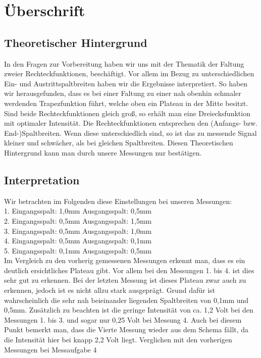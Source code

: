 
\section{Überschrift}
\subsection {Theoretischer Hintergrund}
In den Fragen zur Vorbereitung haben wir uns mit der Thematik der Faltung zweier Rechteckfunktionen, besch\"aftigt. Vor allem im Bezug zu unterschiedlichen Ein- und Austrittspaltbreiten haben wir die Ergebnisse interpretiert. So haben wir herausgefunden, dass es bei einer Faltung zu einer nah obenhin schmaler werdenden Trapezfunktion f\"uhrt, welche oben ein Plateau in der Mitte besitzt. Sind beide Rechteckfunktionen gleich gro\ss{}, so erh\"alt man eine Dreiecksfunktion mit optimaler Intensit\"at. Die Rechteckfunktionen entsprechen den (Anfangs- bzw. End-)Spaltbreiten. Wenn diese unterschiedlich sind, so ist das zu messende Signal kleiner und schw\"acher, als bei gleichen Spaltbreiten. Diesen Theoretischen Hintergrund kann man  durch unsere Messungen nur best\"atigen. 

\subsection {Interpretation} 
Wir betrachten im Folgenden diese Einstellungen bei unseren Messungen:\\
1. Eingangsspalt: 1,0mm \tab Ausgangsspalt: 0,5mm\\
2. Eingangsspalt: 0,5mm \tab Ausgangsspalt: 1,5mm\\
3. Eingangsspalt: 0,5mm \tab Ausgangsspalt: 1,0mm\\
4. Eingangsspalt: 0,5mm \tab Ausgangsspalt: 0,1mm\\
5. Eingangsspalt: 0,1mm \tab Ausgangsspalt: 0,5mm\\


Im Vergleich zu den vorherig gemessenen Messungen erkennt man, dass es ein deutlich ersichtliches Plateau gibt. Vor allem bei den Messungen 1. bis 4. ist dies sehr gut zu erkennen. Bei der letzten Messung ist dieses Plateau zwar auch zu erkennen, jedoch ist es nicht allzu stark ausgepr\"agt. Grund daf\"ur ist wahrscheinlich die sehr nah beieinander liegenden Spaltbreiten von 0,1mm und 0,5mm. 
Zus\"atzlich zu beachten ist die geringe Intensit\"at von ca. 1,2 Volt bei den Messungen 1. bis 3. und sogar nur 0,25 Volt bei Messung 4.  
Auch bei diesem Punkt bemerkt man, dass die Vierte Messung wieder aus dem Schema f\"allt, da die Intensit\"at hier bei knapp 2,2 Volt liegt. Verglichen mit den vorherigen Messungen bei Messaufgabe 4